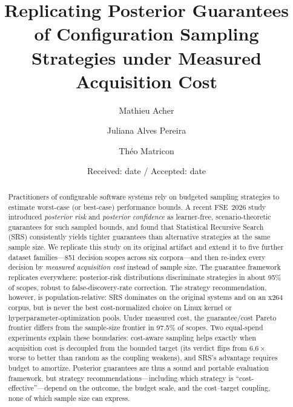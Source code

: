 \documentclass[smallcondensed]{svjour3}
\newcommand{\srs}{SRS\xspace}
\begin{document}
\title{Replicating Posterior Guarantees of Configuration Sampling
Strategies under Measured Acquisition Cost}

\author{Mathieu Acher \and Juliana Alves Pereira \and Th\'eo Matricon}


\date{Received: date / Accepted: date}

\maketitle

\begin{abstract}
Practitioners of configurable software systems rely on budgeted sampling
strategies to estimate worst-case (or best-case) performance bounds. A
recent FSE~2026 study introduced \emph{posterior risk} and
\emph{posterior confidence} as learner-free, scenario-theoretic
guarantees for such sampled bounds, and found that Statistical Recursive
Search (\srs) consistently yields tighter guarantees than alternative
strategies at the same sample size. We replicate this study on its
original artifact and extend it to five further dataset families---851
decision scopes across six corpora---and then re-index every decision by
\emph{measured acquisition cost} instead of sample size. The guarantee
framework replicates everywhere: posterior-risk distributions
discriminate strategies in about 95\% of scopes, robust to
false-discovery-rate correction. The strategy recommendation, however, is
population-relative: \srs{} dominates on the original systems and on an
x264 corpus, but is never the best cost-normalized choice on Linux kernel
or hyperparameter-optimization pools. Under measured cost, the
guarantee/cost Pareto frontier differs from the sample-size frontier in
97.5\% of scopes. Two equal-spend experiments explain these boundaries:
cost-aware sampling helps exactly when acquisition cost is decoupled from
the bounded target (its verdict flips from $6.6\times$ worse to better
than random as the coupling weakens), and \srs's advantage requires
budget to amortize. Posterior guarantees are thus a sound and portable
evaluation framework, but strategy recommendations---including which
strategy is ``cost-effective''---depend on the outcome, the budget scale,
and the cost--target coupling, none of which sample size can express.
\end{abstract}
\end{document}
